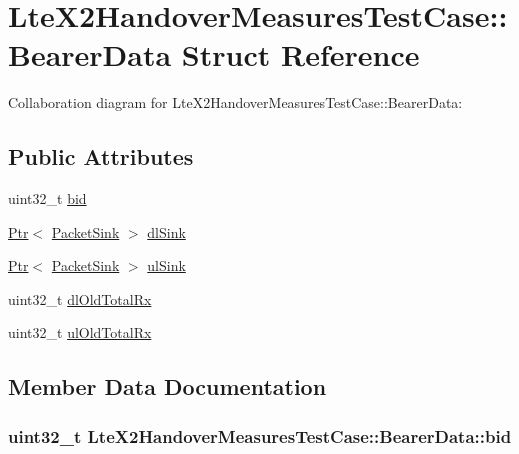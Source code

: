 \hypertarget{structLteX2HandoverMeasuresTestCase_1_1BearerData}{}\section{Lte\+X2\+Handover\+Measures\+Test\+Case\+:\+:Bearer\+Data Struct Reference}
\label{structLteX2HandoverMeasuresTestCase_1_1BearerData}


Collaboration diagram for Lte\+X2\+Handover\+Measures\+Test\+Case\+:\+:Bearer\+Data\+:
\subsection*{Public Attributes}
\begin{DoxyCompactItemize}
\item 
uint32\+\_\+t \hyperlink{structLteX2HandoverMeasuresTestCase_1_1BearerData_a393f3af6d3c37416eebb8d8076df37d5}{bid}
\item 
\hyperlink{classns3_1_1Ptr}{Ptr}$<$ \hyperlink{classns3_1_1PacketSink}{Packet\+Sink} $>$ \hyperlink{structLteX2HandoverMeasuresTestCase_1_1BearerData_a1a79f900f2736306b289f94dcb0d22a4}{dl\+Sink}
\item 
\hyperlink{classns3_1_1Ptr}{Ptr}$<$ \hyperlink{classns3_1_1PacketSink}{Packet\+Sink} $>$ \hyperlink{structLteX2HandoverMeasuresTestCase_1_1BearerData_a65700a2cf93dc3e5ebb87bad0170cd33}{ul\+Sink}
\item 
uint32\+\_\+t \hyperlink{structLteX2HandoverMeasuresTestCase_1_1BearerData_a12502554bf769dfd773e98a9b365ffb3}{dl\+Old\+Total\+Rx}
\item 
uint32\+\_\+t \hyperlink{structLteX2HandoverMeasuresTestCase_1_1BearerData_a059f1e45c3b45612b0a7796ae4b40bc7}{ul\+Old\+Total\+Rx}
\end{DoxyCompactItemize}


\subsection{Member Data Documentation}
\subsubsection[{\texorpdfstring{bid}{bid}}]{\setlength{\rightskip}{0pt plus 5cm}uint32\+\_\+t Lte\+X2\+Handover\+Measures\+Test\+Case\+::\+Bearer\+Data\+::bid}\hypertarget{structLteX2HandoverMeasuresTestCase_1_1BearerData_a393f3af6d3c37416eebb8d8076df37d5}{}\label{structLteX2HandoverMeasuresTestCase_1_1BearerData_a393f3af6d3c37416eebb8d8076df37d5}

